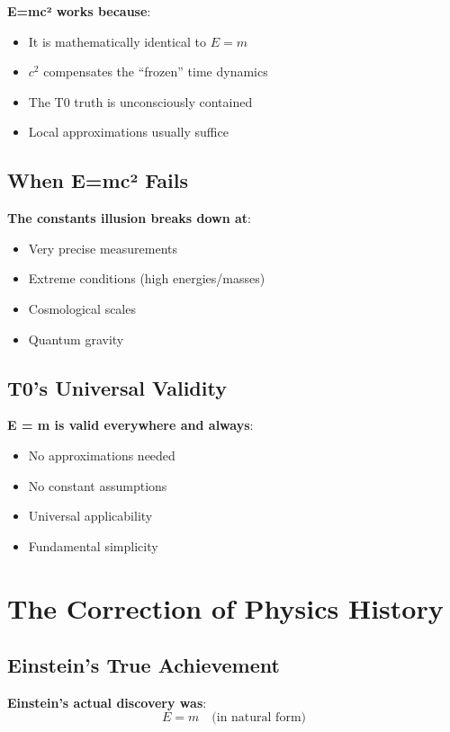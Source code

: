 	\textbf{E=mc² works because}:
	\begin{itemize}
		\item It is mathematically identical to $E = m$
		\item $c^2$ compensates the ``frozen'' time dynamics
		\item The T0 truth is unconsciously contained
		\item Local approximations usually suffice
	\end{itemize}
	
	\subsection{When E=mc² Fails}
	
	\textbf{The constants illusion breaks down at}:
	\begin{itemize}
		\item Very precise measurements
		\item Extreme conditions (high energies/masses)
		\item Cosmological scales
		\item Quantum gravity
	\end{itemize}
	
	\subsection{T0's Universal Validity}
	
	\textbf{E = m is valid everywhere and always}:
	\begin{itemize}
		\item No approximations needed
		\item No constant assumptions
		\item Universal applicability
		\item Fundamental simplicity
	\end{itemize}
	
	\section{The Correction of Physics History}
	
	\subsection{Einstein's True Achievement}
	
	\textbf{Einstein's actual discovery was}:
	\begin{equation}
		E = m \quad \text{(in natural form)}
	\end{equation}
	
